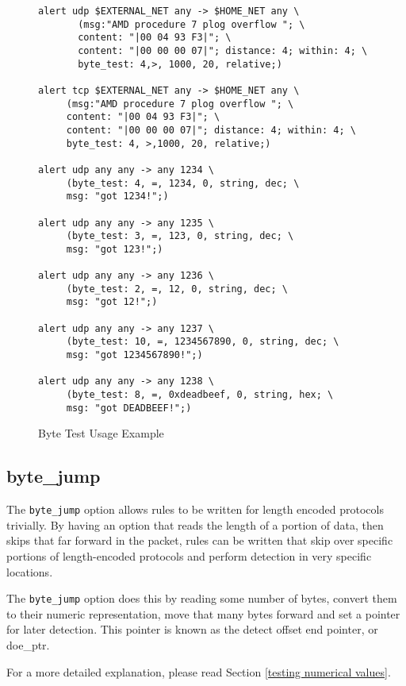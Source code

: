 \documentclass[english]{report}
\begin{document}
\begin{figure}[!hbpt]
\begin{verbatim}
alert udp $EXTERNAL_NET any -> $HOME_NET any \
       (msg:"AMD procedure 7 plog overflow "; \
       content: "|00 04 93 F3|"; \
       content: "|00 00 00 07|"; distance: 4; within: 4; \
       byte_test: 4,>, 1000, 20, relative;)

alert tcp $EXTERNAL_NET any -> $HOME_NET any \
     (msg:"AMD procedure 7 plog overflow "; \
     content: "|00 04 93 F3|"; \
     content: "|00 00 00 07|"; distance: 4; within: 4; \
     byte_test: 4, >,1000, 20, relative;)

alert udp any any -> any 1234 \
     (byte_test: 4, =, 1234, 0, string, dec; \
     msg: "got 1234!";)

alert udp any any -> any 1235 \
     (byte_test: 3, =, 123, 0, string, dec; \
     msg: "got 123!";)

alert udp any any -> any 1236 \
     (byte_test: 2, =, 12, 0, string, dec; \
     msg: "got 12!";)

alert udp any any -> any 1237 \
     (byte_test: 10, =, 1234567890, 0, string, dec; \
     msg: "got 1234567890!";)

alert udp any any -> any 1238 \
     (byte_test: 8, =, 0xdeadbeef, 0, string, hex; \
     msg: "got DEADBEEF!";)
\end{verbatim}
\caption{Byte Test Usage Example \label{fig:byte_test}}
\end{figure}

\subsection{byte\_jump\label{sub:byte_jump}}

The \texttt{byte\_jump} option allows rules to be written for length encoded protocols 
trivially. By having an option that reads the length of a portion of data,
then skips that far forward in the packet, rules can be written that skip
over specific portions of length-encoded protocols and perform detection in very specific locations.

The \texttt{byte\_jump} option does this by reading some number of bytes, convert them
to their numeric representation, move that many bytes forward and set a pointer
for later detection.  This pointer is known as the detect offset end pointer, or doe\_ptr.

For a more detailed explanation, please read Section \ref{testing numerical values}.
\end{document}

